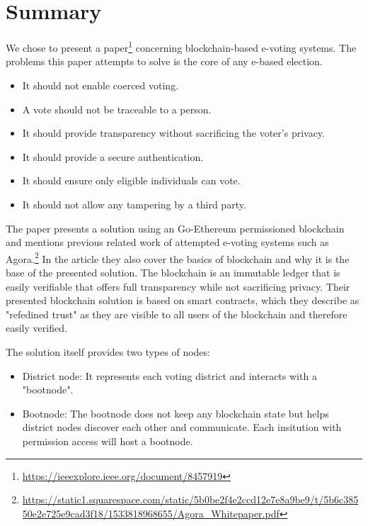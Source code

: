 \section{Summary}\label{sec:summary}
We chose to present a paper\footnote{\href{https://ieeexplore.ieee.org/
document/8457919}{https://ieeexplore.ieee.org/document/8457919}}
concerning blockchain-based e-voting systems. The problems this paper
attempts to solve is the core of any e-based election.
\begin{itemize}
  \item It should not enable coerced voting.
  \item A vote should not be traceable to a person.
  \item It should provide transparency without sacrificing the voter's privacy.
  \item It should provide a secure authentication.
  \item It should ensure only eligible individuals can vote.
  \item It should not allow any tampering by a third party.
\end{itemize}

The paper presents a solution using an Go-Ethereum permissioned blockchain and
mentions previous related work of attempted e-voting systems such as Agora.\footnote{
\href{https://static1.squarespace.com/static/5b0be2f4e2ccd12e7e8a9be9/t/5b6c38550e2e725e9cad3f18/1533818968655/Agora_Whitepaper.pdf}{https://static1.squarespace.com/static/5b0be2f4e2ccd12e7e8a9be9/t/5b6c38550e2e725e9cad3f18/1533818968655/Agora\_Whitepaper.pdf}} In the article they also cover the basics of
blockchain and why it is the base of the presented solution. The blockchain
is an immutable ledger that is easily verifiable that offers full transparency
while not sacrificing privacy. Their presented blockchain solution is based
on smart contracts, which they describe as "refedined trust" as they are
visible to all users of the blockchain and therefore easily verified.

The solution itself provides two types of nodes:

\begin{itemize}
  \item District node: It represents each voting district and interacts with a "bootnode".
  \item Bootnode: The bootnode does not keep any blockchain state but helps 
district nodes discover each other and communicate. Each insitution with permission
access will host a bootnode.
\end{itemize}

